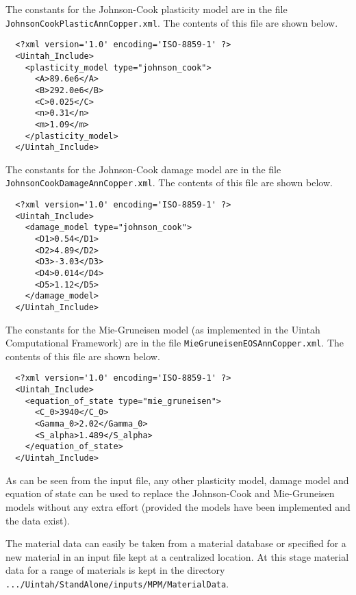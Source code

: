   The constants for the Johnson-Cook plasticity model are in the file
  \verb+JohnsonCookPlasticAnnCopper.xml+.  The contents of this file are
  shown below.
  \begin{verbatim}
  <?xml version='1.0' encoding='ISO-8859-1' ?>
  <Uintah_Include>
    <plasticity_model type="johnson_cook">
      <A>89.6e6</A>
      <B>292.0e6</B>
      <C>0.025</C>
      <n>0.31</n>
      <m>1.09</m>
    </plasticity_model>
  </Uintah_Include>
  \end{verbatim}

  The constants for the Johnson-Cook damage model are in the file
  \verb+JohnsonCookDamageAnnCopper.xml+.  The contents of this file are
  shown below.
  \begin{verbatim}
  <?xml version='1.0' encoding='ISO-8859-1' ?>
  <Uintah_Include>
    <damage_model type="johnson_cook">
      <D1>0.54</D1>
      <D2>4.89</D2>
      <D3>-3.03</D3>
      <D4>0.014</D4>
      <D5>1.12</D5>
    </damage_model>
  </Uintah_Include>
  \end{verbatim}

  The constants for the Mie-Gruneisen model (as implemented in the 
  Uintah Computational Framework) are in the file
  \verb+MieGruneisenEOSAnnCopper.xml+.  The contents of this file are
  shown below.
  \begin{verbatim}
  <?xml version='1.0' encoding='ISO-8859-1' ?>
  <Uintah_Include>
    <equation_of_state type="mie_gruneisen">
      <C_0>3940</C_0>
      <Gamma_0>2.02</Gamma_0>
      <S_alpha>1.489</S_alpha>
    </equation_of_state>
  </Uintah_Include>
  \end{verbatim}

  As can be seen from the input file, any other plasticity model, damage
  model and equation of state can be used to replace the Johnson-Cook
  and Mie-Gruneisen models without any extra effort (provided the models
  have been implemented and the data exist).

  The material data can easily be taken from a material database or specified
  for a new material in an input file kept at a centralized location.  At this
  stage material data for a range of materials is kept in the directory
  \verb|.../Uintah/StandAlone/inputs/MPM/MaterialData|.

